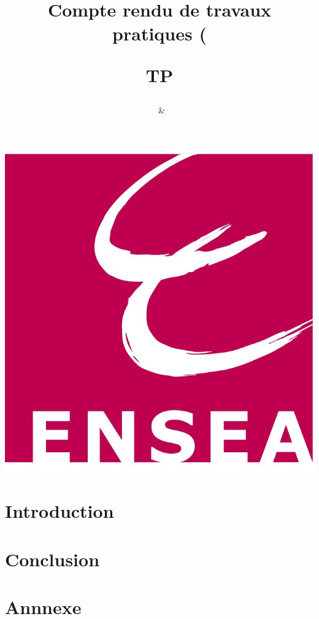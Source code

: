 \documentclass{article}[a4paper]
\title{Compte rendu de travaux pratiques (\subject)\newline TP\numTP}
\author{\binomeUn \ \& \binomeDeux}
\begin{document}
	\maketitle
	\begin{center}
		\includegraphics{"Logo ENSEA"}
	\end{center}
	\tableofcontents
	
	\section{Introduction}
	
	\section{}
	
	\section{Conclusion}
	
	\section{Annnexe}
\end{document}

